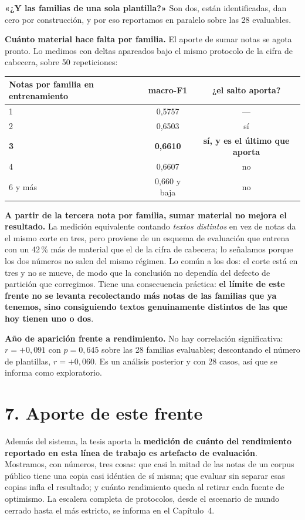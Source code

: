 \documentclass[11pt,a4paper]{article}
\begin{document}
\textbf{«¿Y las familias de una sola plantilla?»} Son dos, están identificadas, dan cero por
construcción, y por eso reportamos en paralelo sobre las 28 evaluables.

\textbf{Cuánto material hace falta por familia.} El aporte de sumar notas se agota pronto. Lo
medimos con deltas apareados bajo el mismo protocolo de la cifra de cabecera, sobre 50
repeticiones:

\begin{center}
\small
\begin{tabular}{lcc}
\toprule
\textbf{Notas por familia en entrenamiento} & \textbf{macro-F1} & \textbf{¿el salto aporta?} \\
\midrule
1 & 0,5757 & --- \\
2 & 0,6503 & sí \\
\textbf{3} & \textbf{0,6610} & \textbf{sí, y es el último que aporta} \\
4 & 0,6607 & no \\
6 y más & 0,660 y baja & no \\
\bottomrule
\end{tabular}
\end{center}

\textbf{A partir de la tercera nota por familia, sumar material no mejora el resultado.} La medición
equivalente contando \emph{textos distintos} en vez de notas da el mismo corte en tres, pero
proviene de un esquema de evaluación que entrena con un 42\,\% más de material que el de la cifra de
cabecera; lo señalamos porque los dos números no salen del mismo régimen. Lo común a los dos: el
corte está en tres y no se mueve, de modo que la conclusión no dependía del defecto de partición que
corregimos. Tiene una consecuencia práctica: \textbf{el límite de este frente no se levanta
recolectando más notas de las familias que ya tenemos, sino consiguiendo textos genuinamente
distintos de las que hoy tienen uno o dos}.

\textbf{Año de aparición frente a rendimiento.} No hay correlación significativa: $r = +0{,}091$ con
$p = 0{,}645$ sobre las 28 familias evaluables; descontando el número de plantillas, $r = +0{,}060$.
Es un análisis posterior y con 28 casos, así que se informa como exploratorio.

\section*{7. Aporte de este frente}

Además del sistema, la tesis aporta la \textbf{medición de cuánto del rendimiento reportado en esta
línea de trabajo es artefacto de evaluación}. Mostramos, con números, tres cosas: que casi la mitad
de las notas de un corpus público tiene una copia casi idéntica de sí misma; que evaluar sin separar
esas copias infla el resultado; y cuánto rendimiento queda al retirar cada fuente de optimismo. La
escalera completa de protocolos, desde el escenario de mundo cerrado hasta el más estricto, se
informa en el Capítulo~4.
\end{document}

